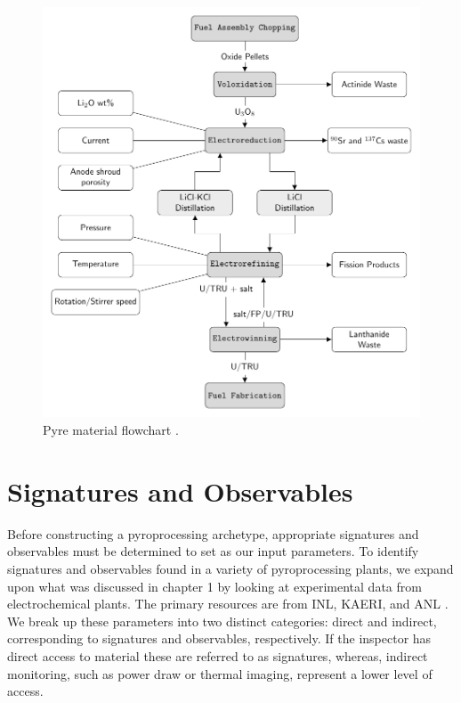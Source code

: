 \begin{figure}[h]
	\centering
	\includegraphics[width=0.9\linewidth]{images/flowchart}
	\caption{Pyre material flowchart \cite{borrelli_approaches_2017}.}
	\label{fig:flowchart}
\end{figure}

\FloatBarrier

\section{Signatures and Observables}

Before constructing a pyroprocessing archetype, appropriate signatures and observables must be determined to set as our input parameters. To identify signatures and observables 
found in a variety of pyroprocessing plants, we expand upon what was discussed in chapter 1 by looking at experimental data from electrochemical plants. The primary resources are from 
INL, KAERI, and ANL \cite{lee_korean_2011,flowsheet_1998,michael_f._simpson_developments_2012,li_electrorefining_2005}. We break up these parameters into two distinct categories: direct and indirect, corresponding to signatures and observables, respectively. If the inspector has direct access to material these are referred to as signatures, whereas, indirect monitoring, such as
power draw or thermal imaging, represent a lower level of access. 

